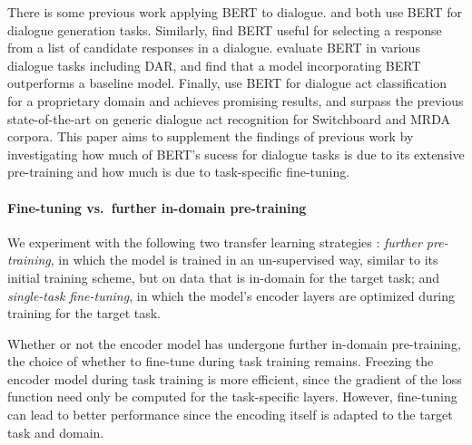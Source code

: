 \documentclass[11pt,a4paper]{article}
\begin{document}
There is some previous work applying BERT to dialogue.
\citet{baoPLATOPretrainedDialogue2019} and \citet{chenSemanticallyConditionedDialog2019a} both use BERT for dialogue generation tasks.
Similarly, \citet{vigComparisonTransferLearningApproaches2019} find BERT useful for selecting a response from a list of candidate responses in a dialogue.
\citet{mehriPretrainingMethodsDialog2019} evaluate BERT in various dialogue tasks including DAR, and find that a model incorporating BERT outperforms a baseline model.
Finally, \citet{chakravarty2019dialog} use BERT for dialogue act classification for a proprietary domain and achieves promising results, and \citet{ribeiro2019deep} surpass the previous state-of-the-art on generic dialogue act recognition for Switchboard and MRDA corpora. 
This paper aims to supplement the findings of previous work by investigating how much of 
BERT's sucess for dialogue tasks is due to its extensive pre-training and how much is due to 
task-specific fine-tuning.




\paragraph{Fine-tuning vs.~further in-domain pre-training}
We experiment with the following two transfer learning strategies \citep{sunHowFineTuneBERT2019}:
\emph{further pre-training}, in which the model is trained in an un-supervised way, similar to its initial training scheme, but on data that is in-domain for the target task; and
\emph{single-task fine-tuning}, in which the model's encoder layers are optimized during training for the target task.

Whether or not the encoder model has undergone further in-domain pre-training, 
the choice of whether to fine-tune during task training remains.
Freezing the encoder model during task training is more efficient, 
since the gradient of the loss function need only be computed for the task-specific layers.
However, fine-tuning can lead to better performance since the encoding itself is adapted to the target task and domain.
\end{document}
